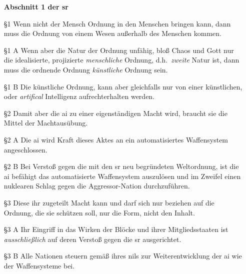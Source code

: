\begin{itemize}
  \item[] \textbf{Abschnitt 1 der \ac{sr}}
  \item[§1] Wenn nicht der Mensch Ordnung in den Menschen bringen kann, dann
    muss die Ordnung von einem Wesen außerhalb des Menschen kommen. 
  \item[§1 A] Wenn aber die Natur der Ordnung unfähig, bloß Chaos und Gott nur
    die idealisierte, projizierte \emph{menschliche} Ordnung, d.h.~\emph{zweite}
    Natur ist, dann muss die ordnende Ordnung \emph{künstliche} Ordnung sein. 
  \item[§1 B] Die künstliche Ordnung, kann aber gleichfalls nur von einer
    künstlichen, oder \emph{artifical} Intelligenz aufrechterhalten werden. 
  \item[§2] Damit aber die \ac{ai} zu einer eigenständigen Macht wird, braucht
    sie die Mittel der Machtausübung. 
  \item[§2 A] Die \ac{ai} wird Kraft dieses Aktes an ein automatisiertes
    Waffensystem angeschlossen.
  \item[§2 B] Bei Verstoß gegen die mit den \ac{sr} neu begründeten Weltordnung,
    ist die \ac{ai} befähigt das automatisierte Waffensystem auszulösen und im
    Zweifel einen nuklearen Schlag gegen die Aggressor-Nation durchzuführen.
  \item[§3] Diese ihr zugeteilt Macht kann und darf sich nur beziehen auf die
    Ordnung, die sie schützen soll, nur die Form, nicht den Inhalt. 
  \item[§3 A] Ihr Eingriff in das Wirken der Blöcke und ihrer Mitgliedsstaaten
    ist \emph{ausschließlich} auf deren Verstoß gegen die \ac{sr} ausgerichtet.
  \item[§3 B] Alle Nationen steuern gemäß ihres \ac{nil}s zur Weiterentwicklung
    der \ac{ai} wie der Waffensysteme bei.
\end{itemize}

